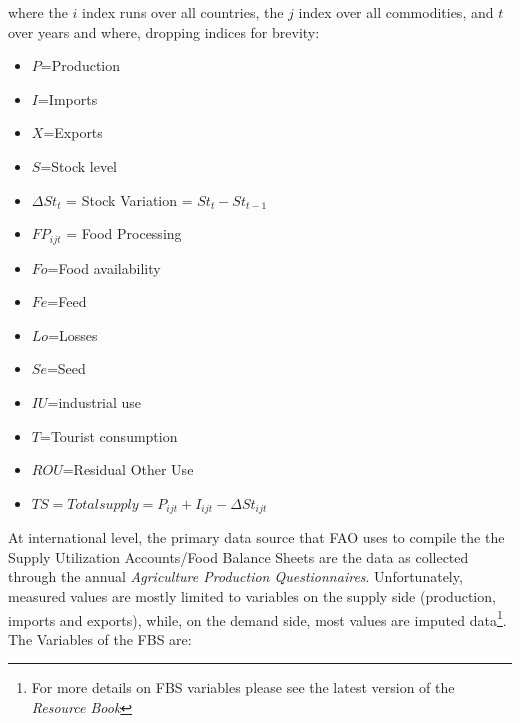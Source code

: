 \documentclass[]{article}
\providecommand{\tightlist}{%
  \setlength{\itemsep}{0pt}\setlength{\parskip}{0pt}}
\let\rmarkdownfootnote\footnote%
\def\footnote{\protect\rmarkdownfootnote}
\begin{document}
where the \(i\) index runs over all countries, the \(j\) index over all
commodities, and \(t\) over years and where, dropping indices for
brevity:

\begin{itemize}
\tightlist
\item
  \(P\)=Production
\item
  \(I\)=Imports
\item
  \(X\)=Exports
\item
  \(S\)=Stock level
\item
  \(\Delta St_{t}\) = Stock Variation = \(St_{t} - St_{t-1}\)
\item
  \(FP_{ijt}\) = Food Processing
\item
  \(Fo\)=Food availability
\item
  \(Fe\)=Feed
\item
  \(Lo\)=Losses
\item
  \(Se\)=Seed
\item
  \(IU\)=industrial use
\item
  \(T\)=Tourist consumption
\item
  \(ROU\)=Residual Other Use
\item
  \(TS = Total supply = P_{ijt} + I_{ijt} - \Delta St_{ijt}\)
\end{itemize}

At international level, the primary data source that FAO uses to compile
the the Supply Utilization Accounts/Food Balance Sheets are the data as
collected through the annual \emph{Agriculture Production
Questionnaires}. Unfortunately, measured values are mostly limited to
variables on the supply side (production, imports and exports), while,
on the demand side, most values are imputed data\footnote{For more
  details on FBS variables please see the latest version of the
  \emph{Resource Book}}. The Variables of the FBS are:
\end{document}
